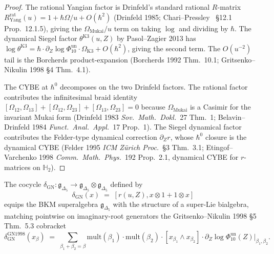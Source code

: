 \begin{proof}
The rational Yangian factor is Drinfeld's standard rational $R$-matrix
$R^{\mathrm{rat}}_{\mathrm{Yang}}(u) = 1 + \hbar\Omega/u + O(\hbar^2)$
(Drinfeld 1985; Chari--Pressley~\cite{ChariPressley1994Guide}
\S12.1 Prop.~12.1.5), giving the $\Omega_{\mathrm{Mukai}}/u$ term on
taking $\log$ and dividing by $\hbar$. The dynamical Siegel factor
$\theta^{\mathrm{K3}}(u, Z)$ by Pasol--Zagier 2013 has
$\log\theta^{\mathrm{K3}} = \hbar\cdot\partial_Z\log\Phi_{10}^{\mathrm{un}}\cdot
\Omega_{\mathrm{K3}} + O(\hbar^2)$, giving the second term. The
$O(u^{-2})$ tail is the Borcherds product-expansion
(Borcherds 1992 Thm.~10.1; Gritsenko--Nikulin 1998 \S4 Thm.~4.1).

The CYBE at $\hbar^0$ decomposes on the two Drinfeld factors. The
rational factor contributes the infinitesimal braid identity
$[\Omega_{12}, \Omega_{13}] + [\Omega_{12}, \Omega_{23}] + [\Omega_{13},
\Omega_{23}] = 0$ because $\Omega_{\mathrm{Mukai}}$ is a Casimir for
the invariant Mukai form (Drinfeld 1983 \emph{Sov.\ Math.\ Dokl.}~27
Thm.~1; Belavin--Drinfeld 1984 \emph{Funct.\ Anal.\ Appl.}~17
Prop.~1). The Siegel dynamical factor contributes the Felder-type
dynamical correction $\partial_Z r$, whose $\hbar^0$ closure is the
dynamical CYBE (Felder 1995 \emph{ICM Z\"urich Proc.}~\S3 Thm.~3.1;
Etingof--Varchenko 1998 \emph{Comm.\ Math.\ Phys.}~192 Prop.~2.1,
dynamical CYBE for $r$-matrices on $\mathbb H_2$).
\end{proof}

\begin{theorem}
\label{thm:qgf-c3-gn-lie-bialgebra}
The cocycle $\delta_{\mathrm{GN}}\colon\mathfrak g_{\Delta_5}\to
\mathfrak g_{\Delta_5}\otimes\mathfrak g_{\Delta_5}$ defined by
\begin{equation}
\label{eq:qgf-delta-gn}
 \delta_{\mathrm{GN}}(x)
 \;=\;
 [r(u, Z), x\otimes 1 + 1\otimes x]
\end{equation}
equips the BKM superalgebra $\mathfrak g_{\Delta_5}$ with the structure
of a super-Lie bialgebra, matching pointwise on imaginary-root
generators the Gritsenko--Nikulin 1998 \S5 Thm.~5.3 cobracket
\begin{equation}
\label{eq:qgf-gn-cobracket-vol3}
 \delta_{\mathrm{GN}}^{\mathrm{GN1998}}(x_\beta)
 \;=\;
 \sum_{\beta_1 + \beta_2 = \beta}
 \mathrm{mult}(\beta_1)\cdot\mathrm{mult}(\beta_2)\cdot
 [x_{\beta_1}\wedge x_{\beta_2}]
 \cdot\partial_Z\log\Phi_{10}^{\mathrm{un}}(Z)|_{\beta_1, \beta_2}.
\end{equation}
\end{theorem}

